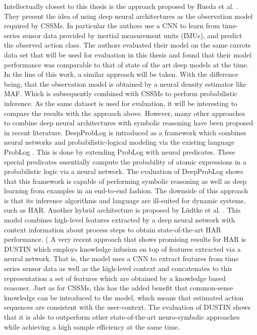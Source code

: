 \documentclass[11pt,titlepage,oneside,openany]{book}
\begin{document}
Intellectually closest to this thesis is the approach proposed by Rueda et al. \cite{rueda_combining_2019}. They present the idea of using deep neural architectures as the observation model required by CSSMs. In particular the authors use a CNN to learn from time-series sensor data provided by inertial measurement units (IMUs), and predict the observed action class. The authors evaluated their model on the same carrots data set that will be used for evaluation in this thesis and found that their model performance was comparable to that of state of the art deep models at the time. In the line of this work, a similar approach will be taken. With the difference being, that the observation model is obtained by a neural density estimator like MAF. Which is subsequently combined with CSSMs to perform probabilistic inference. As the same dataset is used for evaluation, it will be interesting to compare the results with the approach above. However, many other approaches to combine deep neural architectures with symbolic reasoning have been proposed in recent literature. DeepProbLog \cite{manhaeve_deepproblog_2018} is introduced as a framework which combines neural networks and probabilistic-logical modeling via the existing language ProbLog \cite{raedt_problog_nodate}. This is done by extending ProbLog with neural predicates. These special predicates essentially compute the probability of atomic expressions in a probabilistic logic via a neural network. The evaluation of DeepProbLog shows that this framework is capable of performing symbolic reasoning as well as deep learning from examples in an end-to-end fashion. The downside of this approach is that its inference algorithms and language are ill-suited for dynamic systems, such as HAR. Another hybrid architecture is proposed by L\"udtke et al. \cite{ludtke_human_2021}. This model combines high-level features extracted by a deep neural network with context information about process steps to obtain state-of-the-art HAR performance. (%
A very recent approach that shows promising results for HAR is DUSTIN \cite{arrotta_knowledge_2022} which employs knowledge infusion on top of features extracted via a neural network. That is, the model uses a CNN to extract features from time series sensor data as well as the high-level context and concatenates to this representation a set of features which are obtained by a knowledge based reasoner. Just as for CSSMs, this has the added benefit that common-sense knowledge can be introduced to the model, which means that estimated action sequences are consistent with the user-context. The evaluation of DUSTIN shows that it is able to outperform other state-of-the-art neuro-symbolic approaches while achieving a high sample efficiency at the same time.
\end{document}
